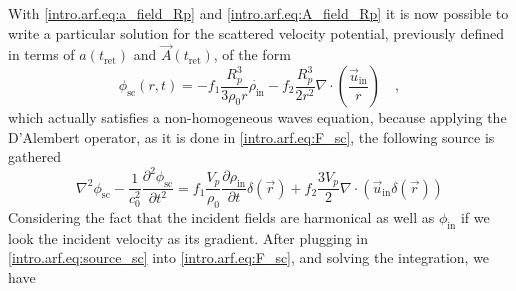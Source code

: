 With \eqref{intro.arf.eq:a_field_Rp} and \eqref{intro.arf.eq:A_field_Rp} it is now possible to write a particular solution for the scattered velocity potential, previously defined in terms of $a(t_{\text{ret}})$ and $\vec A(t_{\text{ret}})$, of the form
\begin{equation}
    \phi_{\text{sc}}(r,t) = -f_1\frac{R_p^3}{3\rho_0 r}\dot{\rho_{\text{in}}} - f_2\frac{R_p^3}{2r^2}\nabla\cdot\left(\frac{\vec u_{\text{in}}}{r}\right)\quad,
\end{equation}
which actually satisfies a non-homogeneous waves equation, because applying the D'Alembert operator, as it is done in \eqref{intro.arf.eq:F_sc}, the following source is gathered
\begin{equation}\label{intro.arf.eq:source_sc}
    \nabla^2\phi_{\text{sc}} - \frac{1}{c_0^2}\frac{\partial^2\phi_{\text{sc}}}{\partial t^2} = f_1\frac{V_p}{\rho_0}\frac{\partial\rho_{\text{in}}}{\partial t}\delta(\vec r) + f_2\frac{3V_p}{2}\nabla\cdot\left(\vec u_{\text{in}}\delta(\vec r)\right)
\end{equation}
Considering the fact that the incident fields are harmonical as well as $\phi_{\text{in}}$ if we look the incident velocity as its gradient. After plugging in \eqref{intro.arf.eq:source_sc} into \eqref{intro.arf.eq:F_sc}, and solving the integration, we have

